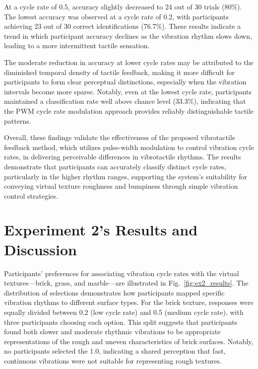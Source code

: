At a cycle rate of 0.5, accuracy slightly decreased to 24 out of 30 trials (80\%). The lowest accuracy was observed at a cycle rate of 0.2, with participants achieving 23 out of 30 correct identifications (76.7\%). These results indicate a trend in which participant accuracy declines as the vibration rhythm slows down, leading to a more intermittent tactile sensation. %

The moderate reduction in accuracy at lower cycle rates may be attributed to the diminished temporal density of tactile feedback, making it more difficult for participants to form clear perceptual distinctions, especially when the vibration intervals become more sparse. Notably, even at the lowest cycle rate, participants maintained a classification rate well above chance level (33.3\%), indicating that the PWM cycle rate modulation approach provides reliably distinguishable tactile patterns.

Overall, these findings validate the effectiveness of the proposed vibrotactile feedback method, which utilizes pulse-width modulation to control vibration cycle rates, in delivering perceivable differences in vibrotactile rhythms. The results demonstrate that participants can accurately classify distinct cycle rates, particularly in the higher rhythm ranges, supporting the system’s suitability for conveying virtual texture roughness and bumpiness through simple vibration control strategies.

\section{Experiment 2's Results and Discussion}
Participants' preferences for associating vibration cycle rates with the virtual textures—brick, grass, and marble—are illustrated in Fig.~\ref{fig:ex2_results}. The distribution of selections demonstrates how participants mapped specific vibration rhythms to different surface types. For the brick texture, responses were equally divided between 0.2 (low cycle rate) and 0.5 (medium cycle rate), with three participants choosing each option. This split suggests that participants found both slower and moderate rhythmic vibrations to be appropriate representations of the rough and uneven characteristics of brick surfaces. Notably, no participants selected the 1.0, indicating a shared perception that fast, continuous vibrations were not suitable for representing rough textures.

